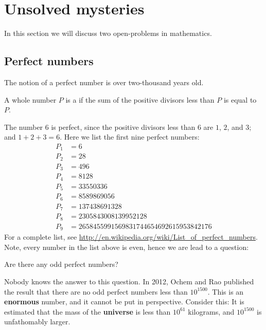\documentclass{ximera}
\begin{document}
\section{Unsolved mysteries}

In this section we will discuss two open-problems in mathematics.

\subsection{Perfect numbers}

The notion of a perfect number is over two-thousand years old.

\begin{definition}
  A whole number $P$ is a  if the sum of the
  positive divisors less than $P$ is equal to $P$.
\end{definition}
The number $6$ is perfect, since the positive divisors less than $6$
are $1$, $2$, and $3$; and $1+2+3 = 6$.  Here we list the first nine
perfect numbers:
\begin{align*}
P_1 &= 6\\
P_2 &= 28\\
P_3 &= 496\\
P_4 &= 8128\\
P_5 &= 33550336\\
P_6 &= 8589869056\\
P_7 &= 137438691328\\
P_8 &= 2305843008139952128\\
P_9 &= 2658455991569831744654692615953842176
\end{align*}
For a complete list, see
\url{http://en.wikipedia.org/wiki/List_of_perfect_numbers}.  Note,
every number in the list above is even, hence we are lead to a question:


\begin{question}
  Are there any odd perfect numbers?
  \begin{prompt}
    \begin{multipleChoice}
    \end{multipleChoice}
  \end{prompt}
\end{question}

Nobody knows the answer to this question. In 2012, Ochem and Rao
published the result that there are no odd perfect numbers less than
$10^{1500}$. This is an \textbf{enormous} number, and it cannot be put
in perspective. Consider this: It is estimated that the mass of the
\textbf{universe} is less than $10^{61}$ kilograms, and $10^{1500}$ is
unfathomably larger.
\end{document}
